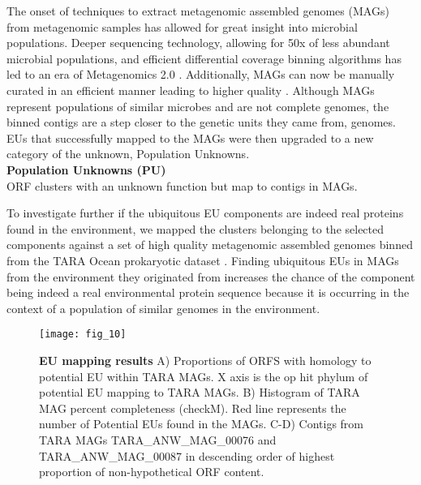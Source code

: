 The onset of techniques to extract metagenomic assembled genomes (MAGs) from metagenomic samples has allowed for great insight into microbial populations. Deeper sequencing technology, allowing for 50x of less abundant microbial populations, and efficient differential coverage binning algorithms has led to an era of Metagenomics 2.0 \citep{McMahon_2015}. Additionally, MAGs can now be manually curated in an efficient manner leading to higher quality \citep{Eren_2015}. Although MAGs represent populations of similar microbes and are not complete genomes, the binned contigs are a step closer to the genetic units they came from, genomes. EUs that successfully mapped to the \cite{Delmont_2017}  MAGs were then upgraded to a new category of the unknown, Population Unknowns.\\

\textbf{Population Unknowns (PU)}\\
ORF clusters with an unknown function but map to contigs in MAGs.

To investigate further if the ubiquitous EU components are indeed real proteins found in the environment, we mapped the clusters belonging to the selected components against a set of high quality metagenomic assembled genomes binned from the TARA Ocean prokaryotic dataset \citep{Delmont_2017}. Finding ubiquitous EUs in MAGs from the environment they originated from increases the chance of the component being indeed a real environmental protein sequence because it is occurring in the context of a population of similar genomes in the environment. \\

\begin{figure}[h!]
	\centering
	\texttt{[image: fig\_10]}
	\caption[EU mapping results]{\textbf{EU mapping results} A) Proportions of ORFS with homology to potential EU within TARA MAGs. X axis is the op hit phylum of potential EU mapping to TARA MAGs. B) Histogram of TARA MAG percent completeness (checkM). Red line represents the number of Potential EUs found in the MAGs. C-D) Contigs from TARA MAGs TARA\_ANW\_MAG\_00076 and TARA\_ANW\_MAG\_00087 in descending order of highest proportion of non-hypothetical ORF content.}
	\label{Fig:3.9}
\end{figure}

